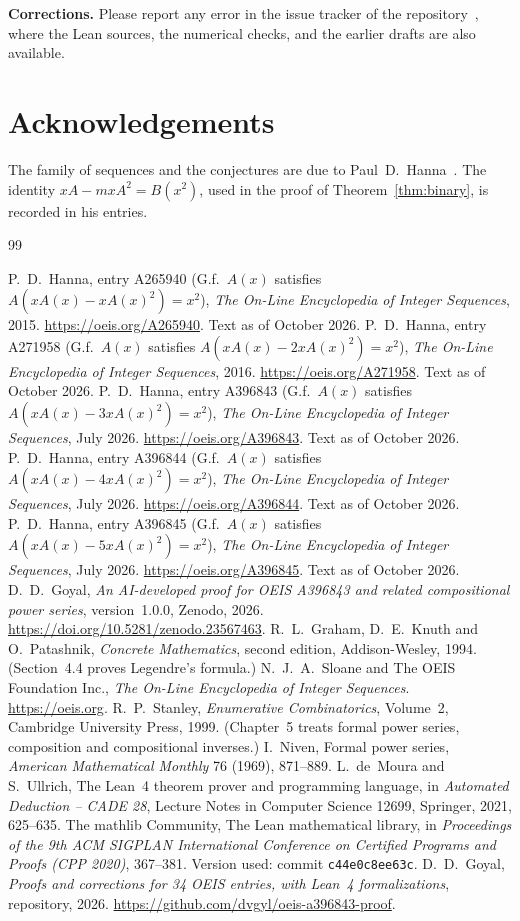\documentclass[11pt,a4paper]{article}
\theoremstyle{definition}
\theoremstyle{remark}
\newcommand{\para}[1]{\par\medskip\noindent\textbf{#1}\enspace}
\begin{document}
\para{Corrections.} Please report any error in the issue tracker of the repository~\cite{repo}, where the Lean
sources, the numerical checks, and the earlier drafts are also available.

\section*{Acknowledgements}
The family of sequences and the conjectures are due to Paul~D.~Hanna~\cite{oeis1,oeis2,oeis3,oeis4,oeis5}. The identity
$xA-mxA^2=B(x^2)$, used in the proof of Theorem~\ref{thm:binary}, is recorded in his entries. 

\begin{thebibliography}{99}\small
\raggedright
{} P.~D.~Hanna, entry A265940 (G.f.\ $A(x)$ satisfies $A(xA(x)-xA(x)^2)=x^2$), \emph{The On-Line Encyclopedia of Integer Sequences}, 2015. \url{https://oeis.org/A265940}. Text as of October 2026.
 P.~D.~Hanna, entry A271958 (G.f.\ $A(x)$ satisfies $A(xA(x)-2xA(x)^2)=x^2$), \emph{The On-Line Encyclopedia of Integer Sequences}, 2016. \url{https://oeis.org/A271958}. Text as of October 2026.
 P.~D.~Hanna, entry A396843 (G.f.\ $A(x)$ satisfies $A(xA(x)-3xA(x)^2)=x^2$), \emph{The On-Line Encyclopedia of Integer Sequences}, July 2026. \url{https://oeis.org/A396843}. Text as of October 2026.
 P.~D.~Hanna, entry A396844 (G.f.\ $A(x)$ satisfies $A(xA(x)-4xA(x)^2)=x^2$), \emph{The On-Line Encyclopedia of Integer Sequences}, July 2026. \url{https://oeis.org/A396844}. Text as of October 2026.
 P.~D.~Hanna, entry A396845 (G.f.\ $A(x)$ satisfies $A(xA(x)-5xA(x)^2)=x^2$), \emph{The On-Line Encyclopedia of Integer Sequences}, July 2026. \url{https://oeis.org/A396845}. Text as of October 2026.
 D.~D.~Goyal, \emph{An AI-developed proof for OEIS A396843 and related compositional power series}, version~1.0.0, Zenodo, 2026. \url{https://doi.org/10.5281/zenodo.23567463}.
 R.~L.~Graham, D.~E.~Knuth and O.~Patashnik, \emph{Concrete Mathematics}, second edition, Addison-Wesley, 1994. (Section~4.4 proves Legendre's formula.)
 N.~J.~A.~Sloane and The OEIS Foundation Inc., \emph{The On-Line Encyclopedia of Integer Sequences}. \url{https://oeis.org}.
 R.~P.~Stanley, \emph{Enumerative Combinatorics}, Volume~2, Cambridge University Press, 1999. (Chapter~5 treats formal power series, composition and compositional inverses.)
 I.~Niven, Formal power series, \emph{American Mathematical Monthly} 76 (1969), 871--889.
 L.~de~Moura and S.~Ullrich, The Lean~4 theorem prover and programming language, in \emph{Automated Deduction -- CADE 28}, Lecture Notes in Computer Science 12699, Springer, 2021, 625--635.
 The mathlib Community, The Lean mathematical library, in \emph{Proceedings of the 9th ACM SIGPLAN International Conference on Certified Programs and Proofs (CPP 2020)}, 367--381. Version used: commit \texttt{c44e0c8ee63c}.
 D.~D.~Goyal, \emph{Proofs and corrections for 34 OEIS entries, with Lean~4 formalizations}, repository, 2026. \url{https://github.com/dvgyl/oeis-a396843-proof}.
\end{thebibliography}
\end{document}
